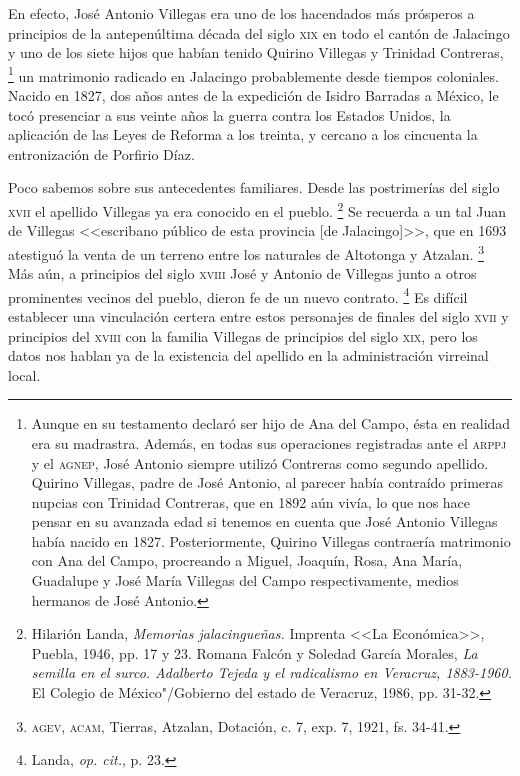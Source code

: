 \documentclass[14pt,twoside,final]{extbook} %
\let\oldfootnote\footnote
\renewcommand\footnote[1]{%
\oldfootnote{\hspace{1mm}#1}}
\begin{document}
En efecto, José Antonio Villegas era uno de los hacendados más prósperos a principios de la antepenúltima década del siglo \textsc{xix} en todo el cantón de Jalacingo y uno de los siete hijos que habían tenido Quirino Villegas y Trinidad Contreras,\footnote{Aunque en su testamento declaró ser hijo de Ana del Campo, ésta en realidad era su madrastra. Además, en todas sus operaciones registradas ante el \textsc{arppj} y el \textsc{agnep}, José Antonio siempre utilizó Contreras como segundo apellido. Quirino Villegas, padre de José Antonio, al parecer había contraído primeras nupcias con Trinidad Contreras, que en 1892 aún vivía, lo que nos hace pensar en su avanzada edad si tenemos en cuenta que José Antonio Villegas había nacido en 1827. Posteriormente, Quirino Villegas contraería matrimonio con Ana del Campo, procreando a Miguel, Joaquín, Rosa, Ana María, Guadalupe y José María Villegas del Campo respectivamente, medios hermanos de José Antonio.} un matrimonio radicado en Jalacingo probablemente desde tiempos coloniales. Nacido en 1827, dos años antes de la expedición de Isidro Barradas a México, le tocó presenciar a sus veinte años la guerra contra los Estados Unidos, la aplicación de las Leyes de Reforma a los treinta, y cercano a los cincuenta la entronización de Porfirio Díaz.

Poco sabemos sobre sus antecedentes familiares. Desde las postrimerías del siglo \textsc{xvii} el apellido Villegas ya era conocido en el pueblo.\footnote{Hilarión Landa, \emph{Memorias jalacingueñas.} Imprenta <<La Económica>>, Puebla, 1946, pp. 17 y 23. Romana Falcón y Soledad García Morales, \emph{La semilla en el surco. Adalberto Tejeda y el radicalismo en Veracruz, 1883-1960.} El Colegio de México"/Gobierno del estado de Veracruz, 1986, pp. 31-32.} Se recuerda a un tal Juan de Villegas <<escribano público de esta provincia [de Jalacingo]>>, que en 1693 atestiguó la venta de un terreno entre los naturales de Altotonga y Atzalan.\footnote{\textsc{agev, acam}, Tierras, Atzalan, Dotación, c. 7, exp. 7, 1921, fs. 34-41.} Más aún, a principios del siglo \textsc{xviii} José y Antonio de Villegas junto a otros prominentes vecinos del pueblo, dieron fe de un nuevo contrato.\footnote{Landa, \emph{op. cit.}, p. 23.} Es difícil establecer una vinculación certera entre estos personajes de finales del siglo \textsc{xvii} y principios del \textsc{xviii} con la familia Villegas de principios del siglo \textsc{xix}, pero los datos nos hablan ya de la existencia del apellido en la administración virreinal local.
\end{document}
